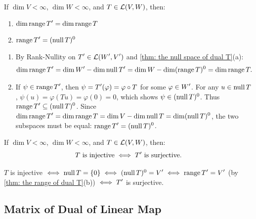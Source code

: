 \begin{thm}
  \label{thm: the range of dual T}
  If $\dim V < \infty$, $\dim W<\infty$, and $T \in \mathcal{L} (V,W)$, then:
  \begin{enumerate}[label=\textbf{(\alph*)}]
    \item $\dim \operatorname{range} \displaystyle T' = \dim \operatorname{range} T$
    \item $\operatorname{range} \displaystyle T' = (\operatorname{null} T)^0$
  \end{enumerate}
\end{thm}
\begin{prf}
  \begin{enumerate}[label=\textbf{(\alph*)}]
    \item By Rank-Nullity on $\displaystyle T' \in \mathcal{L}(\displaystyle W', \displaystyle V')$ and \ref{thm: the null space of dual T}(a):
    \begin{equation}
      \dim \operatorname{range} \displaystyle T' = \dim \displaystyle W' - \dim \operatorname{null} \displaystyle T' = \dim W - \dim(\operatorname{range} T)^0 = \dim \operatorname{range} T.
    \end{equation}
    \item If $\psi \in \operatorname{range} \displaystyle T'$, then $\psi = \displaystyle T'(\varphi) = \varphi \circ T$ for some $\varphi \in \displaystyle W'$. For any $u \in \operatorname{null} T$, $\psi(u) = \varphi(Tu) = \varphi(0) = 0$, which shows $\psi \in (\operatorname{null} T)^0$. Thus $\operatorname{range} \displaystyle T' \subseteq (\operatorname{null} T)^0$.
    Since $\dim \operatorname{range} \displaystyle T' = \dim \operatorname{range} T = \dim V - \dim \operatorname{null} T = \dim (\operatorname{null} T)^0$, the two subspaces must be equal: $\operatorname{range} \displaystyle T' = (\operatorname{null} T)^0$.
  \end{enumerate}
  \vspace{-\baselineskip}
\end{prf}

\begin{thm} 
  If $\dim V < \infty$, $\dim W<\infty$, and $T \in \mathcal{L} (V,W)$, then:
  \begin{equation}
    T \text{ is injective} \iff \displaystyle T' \text{ is surjective.}
  \end{equation}
\end{thm}
\begin{prf}
  $T$ is injective $\iff \operatorname{null} T = \{0\} \iff (\operatorname{null} T)^0 = \displaystyle V' \iff \operatorname{range} \displaystyle T' = \displaystyle V'$ (by \ref{thm: the range of dual T}(b)) $\iff \displaystyle T'$ is surjective.
\end{prf}

\subsection{Matrix of Dual of Linear Map}

